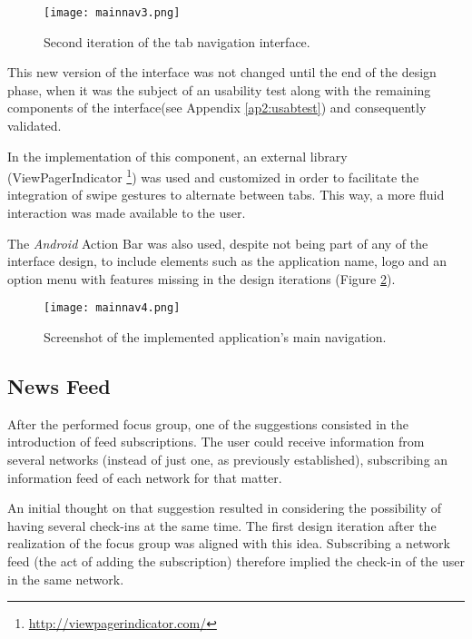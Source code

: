\begin{figure}[h!]
  \begin{center}
    \leavevmode
    \texttt{[image: mainnav3.png]}
    \caption{Second iteration of the tab navigation interface.}
    \label{fig:mainnav3}
  \end{center}
\end{figure}

This new version of the interface was not changed until the end of the design phase, when it was the subject of an usability test along with the remaining components of the interface(see Appendix \ref{ap2:usabtest}) and consequently validated.

In the implementation of this component, an external library (ViewPagerIndicator \footnote{\url{http://viewpagerindicator.com/}}) was used and customized in order to facilitate the integration of swipe gestures to alternate between tabs. This way, a more fluid interaction was made available to the user.

The \emph{Android} Action Bar was also used, despite not being part of any of the interface design, to include elements such as the application name, logo and an option menu with features missing in the design iterations (Figure \ref{fig:mainnav4}).

\begin{figure}[h!]
  \begin{center}
    \leavevmode
    \texttt{[image: mainnav4.png]}
    \caption{Screenshot of the implemented application's main navigation.}
    \label{fig:mainnav4}
  \end{center}
\end{figure}

\subsection{News Feed}\label{newsfeed}

After the performed focus group, one of the suggestions consisted in the introduction of feed subscriptions. The user could receive information from several networks (instead of just one, as previously established), subscribing an information feed of each network for that matter. 

An initial thought on that suggestion resulted in considering the possibility of having several check-ins at the same time. The first design iteration after the realization of the focus group was aligned with this idea. Subscribing a network feed (the act of adding the subscription) therefore implied the check-in of the user in the same network. 

